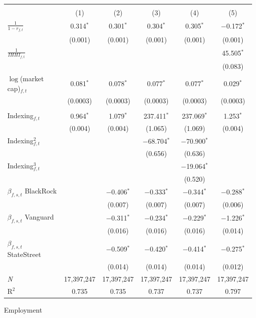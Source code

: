 \begin{frame}
\tiny
\begin{center}
\begin{tabular}{@{\extracolsep{5pt}}lccccc} 
\toprule
\\[-1.8ex] & (1) & (2) & (3) & (4) & (5)\\ 
\midrule
$\frac{1}{1-r_{f,t}}$& 0.314$^{*}$ & 0.301$^{*}$ & 0.304$^{*}$ & 0.305$^{*}$ & $-$0.172$^{*}$ \\ 
  & (0.001) & (0.001) & (0.001) & (0.001) & (0.001) \\ 
$\frac{1}{IHHI_{f,t}}$&  &  &  &  & 45.505$^{*}$ \\ 
  &  &  &  &  & (0.083) \\ 
$\log$(market cap)$_{f,t}$ & 0.081$^{*}$ & 0.078$^{*}$ & 0.077$^{*}$ & 0.077$^{*}$ & 0.029$^{*}$ \\ 
  & (0.0003) & (0.0003) & (0.0003) & (0.0003) & (0.0003) \\ 
  & & & & & \\ 
Indexing$_{f,t}$ & 0.964$^{*}$ & 1.079$^{*}$ &237.411$^{*}$  &237.069$^{*}$  & 1.253$^{*}$ \\ 
  & (0.004) & (0.004) & (1.065) & (1.069) & (0.004) \\ 
Indexing$_{f,t}^2$  &  &  & $-$68.704$^{*}$ &$-$70.900$^{*}$  &  \\ 
  &  &  & (0.656) &(0.636)  &  \\ 
Indexing$_{f,t}^3$ &  &  &  & $-$19.064$^{*}$ &  \\ 
  &  &  &  & (0.520) &  \\ 
$\beta_{f,s,t}$ BlackRock &  & $-$0.406$^{*}$ & $-$0.333$^{*}$ & $-$0.344$^{*}$ & $-$0.288$^{*}$ \\ 
  &  & (0.007) & (0.007) & (0.007) & (0.006) \\ 
$\beta_{f,s,t}$ Vanguard &  & $-$0.311$^{*}$ & $-$0.234$^{*}$ & $-$0.229$^{*}$ & $-$1.226$^{*}$ \\ 
  &  & (0.016) & (0.016) & (0.016) & (0.014) \\ 
$\beta_{f,s,t}$ StateStreet &  & $-$0.509$^{*}$ & $-$0.420$^{*}$ & $-$0.414$^{*}$ & $-$0.275$^{*}$ \\ 
  &  & (0.014) & (0.014) & (0.014) & (0.012) \\ 
  \midrule
 \textit{N} & 17,397,247 & 17,397,247 & 17,397,247 & 17,397,247 & 17,397,247 \\ 
R$^{2}$ & 0.735 & 0.735 & 0.737 & 0.737 & 0.797 \\ 
\bottomrule
\end{tabular} 
\end{center}
\end{frame}




\begin{frame}{Employment}
\begin{center}
\end{center}
\end{frame}

